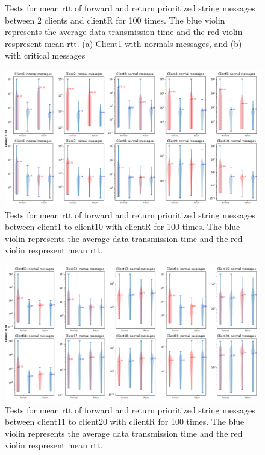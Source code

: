 \begin{figure}[h]
    
    \caption{Tests for mean \gls{rtt} of forward and return prioritized string messages between 2 clients 
    and clientR for 100 times. The blue violin represents the average data transmission time and the red violin 
    respresent mean \gls{rtt}. (a) Client1 with normals messages, and (b) 
    with critical messages} \label{fig: priority-2clients-string}
\end{figure}



\begin{figure}
    \centering
    \includegraphics[width=\textheight]{figures/appendix/priority_tests/log_violin_50clients_string_figure_1.png}\hfill 
    \caption{Tests for mean \gls{rtt} of forward and return prioritized string messages between client1 to client10 
    with clientR for 100 times. The blue violin represents the average data transmission time and the red violin 
    respresent mean \gls{rtt}.} \label{fig: priority-50clients-string-a}
\end{figure}

\begin{figure}
    \includegraphics[width=\textheight]{figures/appendix/priority_tests/log_violin_50clients_string_figure_2.png}\hfill 
    \caption{Tests for mean \gls{rtt} of forward and return prioritized string messages between client11 to client20 
    with clientR for 100 times. The blue violin represents the average data transmission time and the red violin 
    respresent mean \gls{rtt}.} \label{fig: priority-50clients-string-b}
\end{figure}

